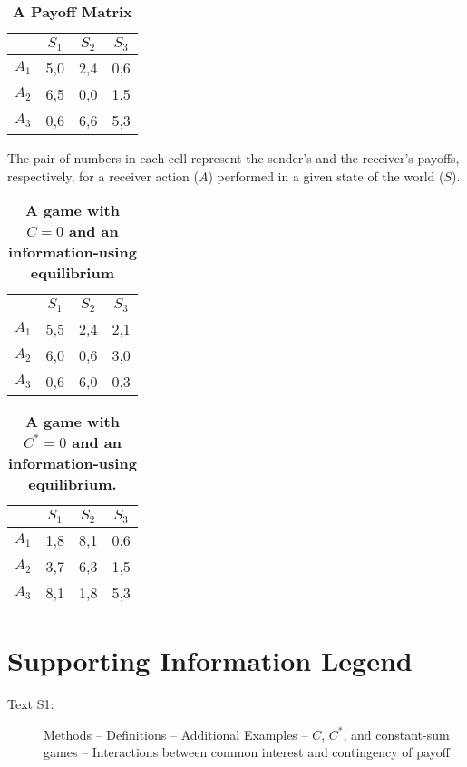 \documentclass[10pt]{article}
\begin{document}
\begin{table}[!ht]
\caption{
\bf{A Payoff Matrix}}
\begin{tabular}{|c||c|c|c|}
& $S_{1}$ & $S_{2}$ & $S_{3}$ \\
\hline
$A_{1}$ & 5,0 & 2,4 & 0,6 \\
$A_{2}$ & 6,5 & 0,0 & 1,5 \\
$A_{3}$ & 0,6 & 6,6 & 5,3 \\
\end{tabular}
\begin{flushleft}The pair of numbers in each cell represent the sender's and the
receiver's payoffs, respectively, for a receiver action ($A$) performed
in a given state of the world ($S$).
\end{flushleft}
\label{tab:label}
\end{table}

\begin{table}[!ht]
\caption{
\bf{A game with $C=0$ and an information-using equilibrium}}
\begin{tabular}{|c||c|c|c|}
& $S_{1}$ & $S_{2}$ & $S_{3}$ \\
\hline
$A_{1}$ & 5,5 & 2,4 & 2,1 \\
$A_{2}$ & 6,0 & 0,6 & 3,0 \\
$A_{3}$ & 0,6 & 6,0 & 0,3 \\
\end{tabular}
\begin{flushleft}
\end{flushleft}
\label{tab:label}
 \end{table}

\begin{table}[!ht]
\caption{
\bf{A game with $C^*=0$ and an information-using equilibrium.}}
\begin{tabular}{|c||c|c|c|}
& $S_{1}$ & $S_{2}$ & $S_{3}$ \\
\hline
$A_{1}$ & 1,8 & 8,1 & 0,6 \\
$A_{2}$ & 3,7 & 6,3 & 1,5 \\
$A_{3}$ & 8,1 & 1,8 & 5,3 \\
\end{tabular}
\begin{flushleft}
\end{flushleft}
\label{tab:label}
 \end{table}

\pagebreak
\section*{Supporting Information Legend}
\begin{description}
    \item[Text S1:]Methods -- Definitions -- Additional Examples -- $C$, $C^*$, and constant-sum games -- Interactions between common interest and contingency of payoff
\end{description}
\end{document}

